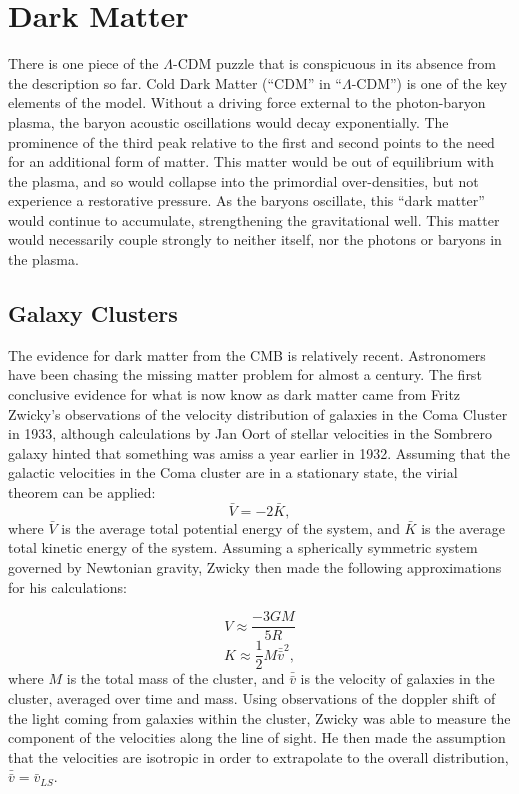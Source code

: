 \section{Dark Matter}
There is one piece of the $\Lambda$-CDM puzzle that is conspicuous in its absence from the description so far. Cold Dark Matter (``CDM'' in ``$\Lambda$-CDM'') is one of the key elements of the model. Without a driving force external to the photon-baryon plasma, the baryon acoustic oscillations would decay exponentially. The prominence of the third peak relative to the first and second points to the need for an additional form of matter. This matter would be out of equilibrium with the plasma, and so would collapse into the primordial over-densities, but not experience a restorative pressure. As the baryons oscillate, this ``dark matter'' would continue to accumulate, strengthening the gravitational well. This matter would necessarily couple strongly to neither itself, nor the photons or baryons in the plasma. 


\subsection{Galaxy Clusters}
The evidence for dark matter from the CMB is relatively recent. Astronomers have been chasing the missing matter problem for almost a century. The first conclusive evidence for what is now know as dark matter came from Fritz Zwicky's observations of the velocity distribution of galaxies in the Coma Cluster in 1933\cite{zwicky}, although calculations by Jan Oort of stellar velocities in the Sombrero galaxy hinted that something was amiss a year earlier in 1932\cite{oort}. Assuming that the galactic velocities in the Coma cluster are in a stationary state, the virial theorem can be applied:
\begin{equation}\label{eq:virial1}
\bar{V}=-2\bar{K},
\end{equation}
where $\bar{V}$ is the average total potential energy of the system, and $\bar{K}$ is the average total kinetic energy of the system. Assuming a spherically symmetric system governed by Newtonian gravity, Zwicky then made the following approximations for his calculations:

\begin{equation}\label{eq:potential}
V \approx \frac{-3GM}{5R}
\end{equation}
\begin{equation}\label{eq:kinetic}
K \approx \frac{1}{2}M \bar{\bar{v}}^{2},
\end{equation}
where $M$ is the total mass of the cluster, and $\bar{\bar{v}}$ is the velocity of galaxies in the cluster, averaged over time and mass. Using observations of the doppler shift of the light coming from galaxies within the cluster, Zwicky was able to measure the component of the velocities along the line of sight. He then made the assumption that the velocities are isotropic in order to extrapolate to the overall distribution, $\bar{\bar{v}}=\bar{v}_{LS}$.

